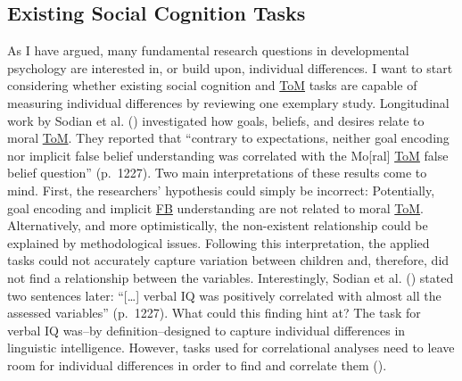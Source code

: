 \documentclass[
]{scrbook}
\begin{document}
\subsection{Existing Social Cognition Tasks}\label{existing-social-cognition-tasks}

As I have argued, many fundamental research questions in developmental psychology are interested in, or build upon, individual differences. I want to start considering whether existing social cognition and \hyperref[acronyms_ToM]{ToM} tasks are capable of measuring individual differences by reviewing one exemplary study. Longitudinal work by Sodian et al. () investigated how goals, beliefs, and desires relate to moral \hyperref[acronyms_ToM]{ToM}. They reported that ``contrary to expectations, neither goal encoding nor implicit false belief understanding was correlated with the Mo{[}ral{]} \hyperref[acronyms_ToM]{ToM} false belief question'' (p.~1227). Two main interpretations of these results come to mind. First, the researchers' hypothesis could simply be incorrect: Potentially, goal encoding and implicit \hyperref[acronyms_FB]{FB} understanding are not related to moral \hyperref[acronyms_ToM]{ToM}. Alternatively, and more optimistically, the non-existent relationship could be explained by methodological issues. Following this interpretation, the applied tasks could not accurately capture variation between children and, therefore, did not find a relationship between the variables. Interestingly, Sodian et al. () stated two sentences later: ``{[}\ldots{]} verbal IQ was positively correlated with almost all the assessed variables'' (p.~1227). What could this finding hint at? The task for verbal IQ was\thinspace --\thinspace by definition\thinspace --\thinspace designed to capture individual differences in linguistic intelligence. However, tasks used for correlational analyses need to leave room for individual differences in order to find and correlate them ().
\end{document}

